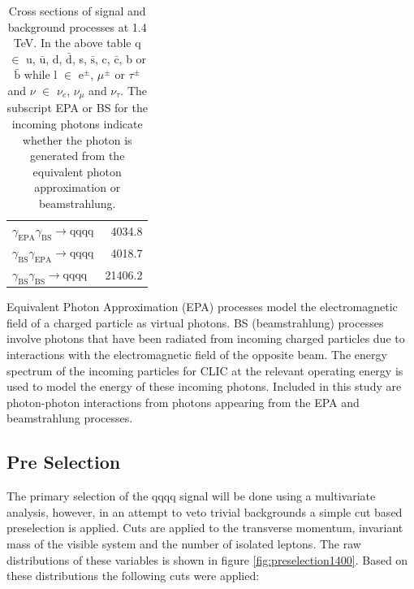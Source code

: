 \begin{table}[h!]
\begin{tabular}{ l r }
$\gamma_{\text{EPA}}\gamma_{\text{BS}} \rightarrow \text{qqqq}$ & 4034.8\\
$\gamma_{\text{BS}}\gamma_{\text{EPA}} \rightarrow \text{qqqq}$ & 4018.7\\
$\gamma_{\text{BS}}\gamma_{\text{BS}} \rightarrow \text{qqqq}$ & 21406.2\\
\hline
\end{tabular}
\caption[]{Cross sections of signal and background processes at 1.4 TeV. In the above table q $\in$ u, $\bar{\text{u}}$, d, $\bar{\text{d}}$, s, $\bar{\text{s}}$, c, $\bar{\text{c}}$, b or $\bar{\text{b}}$ while l $\in$ $\text{e}^{\pm}$, $\mu^{\pm}$ or $\tau^{\pm}$ and $\nu$ $\in$ $\nu_{e}$, $\nu_{\mu}$ and $\nu_{\tau}$.  The subscript EPA or BS for the incoming photons indicate whether the photon is generated from the equivalent photon approximation or beamstrahlung.}
\label{table:crosssectionfull}
\end{table}

Equivalent Photon Approximation (EPA) processes model the electromagnetic field of a charged particle as virtual photons.  BS (beamstrahlung) processes involve photons that have been radiated from incoming charged particles due to interactions with the electromagnetic field of the opposite beam.   The energy spectrum of the incoming particles for CLIC at the relevant operating energy is used to model the energy of these incoming photons.  Included in this study are photon-photon interactions from photons appearing from the EPA and beamstrahlung processes.


\subsection{Pre Selection}
\label{sec:preselection1400GeV}
The primary selection of the \nu{\nu}qqqq signal will be done using a multivariate analysis, however, in an attempt to veto trivial backgrounds a simple cut based preselection is applied. Cuts are applied to the transverse momentum, invariant mass of the visible system and the number of isolated leptons. The raw distributions of these variables is
shown in figure \ref{fig:preselection1400}. Based on these distributions the following cuts were applied:

